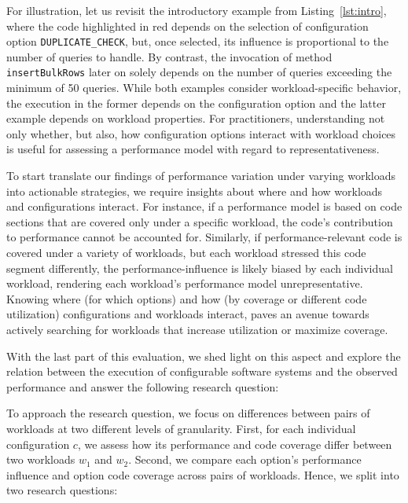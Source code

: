 
For illustration, let us revisit the introductory example from Listing~\ref{lst:intro}, where the code highlighted in\label{sec:rq3} red depends on the selection of configuration option \texttt{DUPLICATE\_CHECK}, but, once selected, its influence is proportional to the number of queries to handle. By contrast, the invocation of method \texttt{insertBulkRows} later on solely depends on the number of queries exceeding the minimum of 50 queries. While both examples consider workload-specific behavior, the execution in the former depends on the configuration option and the latter example depends on workload properties. 
For practitioners, understanding not only whether, but also, how configuration options interact with workload choices is useful for assessing a performance model with regard to representativeness. 

To start translate our findings of performance variation under varying workloads into actionable strategies, we require insights about where and how workloads and configurations interact. For instance, if a performance model is based on code sections that are covered only under a specific workload, the code’s contribution to performance cannot be accounted for. Similarly, if performance-relevant code is covered under a variety of workloads, but each workload stressed this code segment differently, the performance-influence is likely biased by each individual workload, rendering each workload's performance model unrepresentative. Knowing where (for which options) and how (by coverage or different code utilization) configurations and workloads interact, paves an avenue towards actively searching for workloads that increase utilization or maximize coverage.

With the last part of this evaluation, we shed light on this aspect and explore the relation between the execution of configurable software systems and the observed performance and answer the following research question:


To approach the research question, we focus on differences between pairs of workloads at two different levels of granularity. First, for each individual configuration $c$, we assess  how its performance and code coverage differ between two workloads $w_1$ and $w_2$. Second, we compare each option's performance influence and option code coverage across pairs of workloads. Hence, we split  into two research questions:

